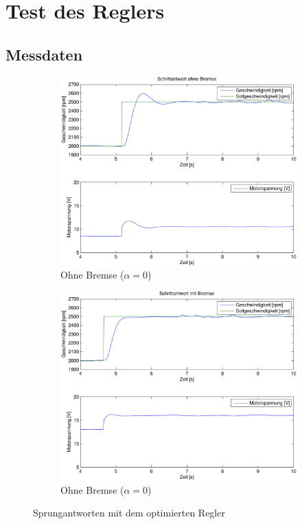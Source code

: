 \section{Test des Reglers}

\subsection{Messdaten}

\begin{figure}[h!]
	\centering
	\begin{subfigure}{0.475\textwidth}
		\includegraphics[width=1\textwidth]{12/step_noload.pdf}
		\caption{Ohne Bremse ($\alpha = 0$)}
	\end{subfigure}
	\hfill{}
	\begin{subfigure}{0.475\textwidth}
		\includegraphics[width=1\textwidth]{12/step_load.pdf}
		\caption{Ohne Bremse ($\alpha = 0$)}
	\end{subfigure}
	\caption{Sprungantworten mit dem optimierten Regler}
\end{figure}


